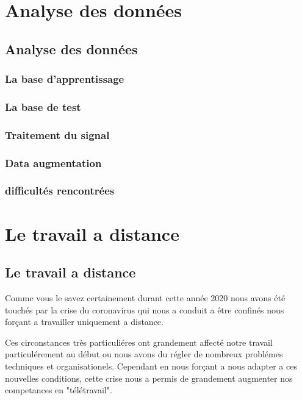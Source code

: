 {{\chapter{Analyse des données}\label{Analyse des données}}
\hypertarget{analysedesdonnees}{%
\section{Analyse des données}

\subsection{La base d'apprentissage}

\subsection{La base de test}

\subsection{Traitement du signal}

\subsection{Data augmentation}


\subsection{difficultés rencontrées}





\chapter{Le travail a distance}\label{Le travail à distance}}
\section{Le travail a distance}


Comme vous le savez certainement durant cette année 2020 nous avons été touchés par la crise du coronavirus qui nous a conduit a être confinés nous forçant a travailler uniquement a distance.

Ces circonstances très particuliéres ont grandement affecté notre travail particulérement au début ou nous avons du régler de nombreux problémes techniques et organisationels. Cependant en nous forçant a nous adapter a ces nouvelles conditions, cette crise nous a permis de grandement augmenter nos competances en "télétravail".

}
